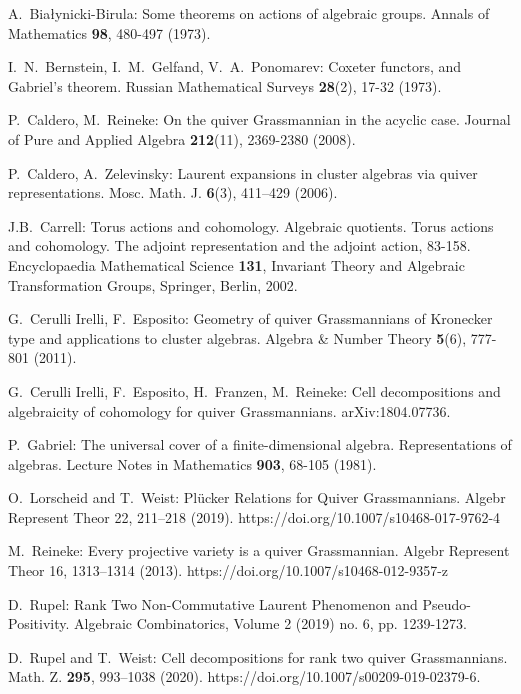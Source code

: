 \documentclass{amsart}
\numberwithin{equation}{section}
\begin{document}
\begin{thebibliography}{10}

  A.~Bia\l{}ynicki-Birula: Some theorems on actions of algebraic groups. Annals of Mathematics \textbf{98}, 480-497 (1973).

  I.~N.~Bernstein, I.~M.~Gelfand, V.~A.~Ponomarev: Coxeter functors, and Gabriel's theorem. Russian Mathematical Surveys \textbf{28}(2), 17-32 (1973).

  P.~Caldero, M.~Reineke: On the quiver Grassmannian in the acyclic case. Journal of Pure and Applied Algebra \textbf{212}(11), 2369-2380 (2008).

  P.~Caldero, A.~Zelevinsky: Laurent expansions in cluster algebras via quiver representations. Mosc. Math. J. \textbf{6}(3), 411–429 (2006).

  J.B.~Carrell: Torus actions and cohomology. Algebraic quotients. Torus actions and cohomology. The adjoint representation and the adjoint action, 83-158. Encyclopaedia Mathematical Science \textbf{131}, Invariant Theory and Algebraic Transformation Groups, Springer, Berlin, 2002.

  G.~Cerulli Irelli, F.~Esposito: Geometry of quiver Grassmannians of Kronecker type and applications to cluster algebras. Algebra \&  Number Theory \textbf{5}(6), 777-801 (2011).

  G.~Cerulli Irelli, F.~Esposito, H.~Franzen, M.~Reineke: Cell decompositions and algebraicity of cohomology for quiver Grassmannians. arXiv:1804.07736.

  P.~Gabriel: The universal cover of a finite-dimensional algebra. Representations of algebras. Lecture Notes in Mathematics {\bf 903}, 68-105 (1981).

  O.~Lorscheid and T.~Weist: Plücker Relations for Quiver Grassmannians. Algebr Represent Theor 22, 211–218 (2019). https://doi.org/10.1007/s10468-017-9762-4

  M.~Reineke: Every projective variety is a quiver Grassmannian. Algebr Represent Theor 16, 1313–1314 (2013). https://doi.org/10.1007/s10468-012-9357-z

  D.~Rupel: Rank Two Non-Commutative Laurent Phenomenon and Pseudo-Positivity.   Algebraic Combinatorics, Volume 2 (2019) no. 6, pp. 1239-1273.

  D.~Rupel and T.~Weist: Cell decompositions for rank two quiver Grassmannians.  Math. Z. \textbf{295}, 993–1038 (2020). https://doi.org/10.1007/s00209-019-02379-6.

\end{thebibliography}
\end{document}
